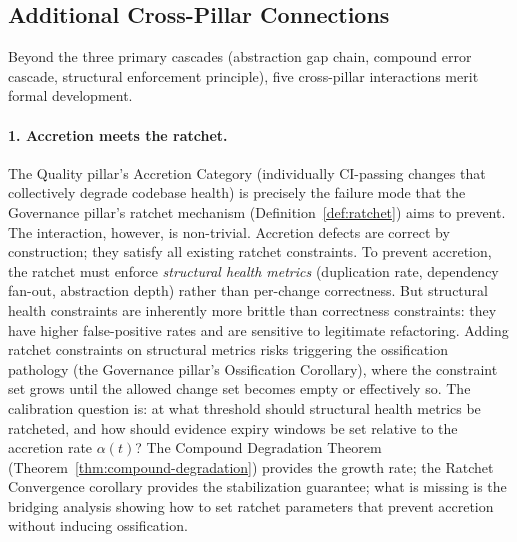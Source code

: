 \documentclass[11pt, a4paper]{googledeepmind}
\begin{document}
\subsection{Additional Cross-Pillar Connections}
\label{sec:missed-connections}

Beyond the three primary cascades (abstraction gap chain, compound error cascade, structural enforcement principle), five cross-pillar interactions merit formal development.

\paragraph{1. Accretion meets the ratchet.}
The Quality pillar's Accretion Category (individually CI-passing changes that collectively degrade codebase health) is precisely the failure mode that the Governance pillar's ratchet mechanism (Definition~\ref{def:ratchet}) aims to prevent. The interaction, however, is non-trivial. Accretion defects are correct by construction; they satisfy all existing ratchet constraints. To prevent accretion, the ratchet must enforce \emph{structural health metrics} (duplication rate, dependency fan-out, abstraction depth) rather than per-change correctness. But structural health constraints are inherently more brittle than correctness constraints: they have higher false-positive rates and are sensitive to legitimate refactoring. Adding ratchet constraints on structural metrics risks triggering the ossification pathology (the Governance pillar's Ossification Corollary), where the constraint set grows until the allowed change set becomes empty or effectively so. The calibration question is: at what threshold should structural health metrics be ratcheted, and how should evidence expiry windows be set relative to the accretion rate $\alpha(t)$? The Compound Degradation Theorem (Theorem~\ref{thm:compound-degradation}) provides the growth rate; the Ratchet Convergence corollary provides the stabilization guarantee; what is missing is the bridging analysis showing how to set ratchet parameters that prevent accretion without inducing ossification.
\end{document}
